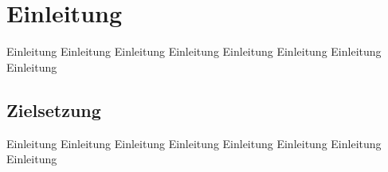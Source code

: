 \chapter{Einleitung}
    Einleitung Einleitung Einleitung Einleitung Einleitung Einleitung Einleitung Einleitung
    \section{Zielsetzung}
    Einleitung Einleitung Einleitung Einleitung Einleitung Einleitung Einleitung Einleitung

    
    